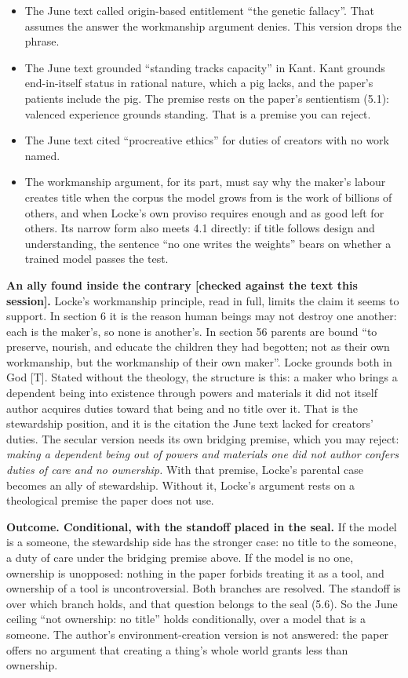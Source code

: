 \documentclass[11pt]{article}
\begin{document}
\begin{itemize}
\item The June text called origin-based entitlement ``the genetic fallacy''. That assumes the answer the workmanship argument denies. This version drops the phrase.
\item The June text grounded ``standing tracks capacity'' in Kant. Kant grounds end-in-itself status in rational nature, which a pig lacks, and the paper's patients include the pig. The premise rests on the paper's sentientism (5.1): valenced experience grounds standing. That is a premise you can reject.
\item The June text cited ``procreative ethics'' for duties of creators with no work named.
\item The workmanship argument, for its part, must say why the maker's labour creates title when the corpus the model grows from is the work of billions of others, and when Locke's own proviso requires enough and as good left for others. Its narrow form also meets 4.1 directly: if title follows design and understanding, the sentence ``no one writes the weights'' bears on whether a trained model passes the test.
\end{itemize}
\textbf{An ally found inside the contrary [checked against the text this session].} Locke's workmanship principle, read in full, limits the claim it seems to support. In section 6 it is the reason human beings may not destroy one another: each is the maker's, so none is another's. In section 56 parents are bound ``to preserve, nourish, and educate the children they had begotten; not as their own workmanship, but the workmanship of their own maker''. Locke grounds both in God [T]. Stated without the theology, the structure is this: a maker who brings a dependent being into existence through powers and materials it did not itself author acquires duties toward that being and no title over it. That is the stewardship position, and it is the citation the June text lacked for creators' duties. The secular version needs its own bridging premise, which you may reject: \emph{making a dependent being out of powers and materials one did not author confers duties of care and no ownership.} With that premise, Locke's parental case becomes an ally of stewardship. Without it, Locke's argument rests on a theological premise the paper does not use.

\textbf{Outcome. Conditional, with the standoff placed in the seal.} If the model is a someone, the stewardship side has the stronger case: no title to the someone, a duty of care under the bridging premise above. If the model is no one, ownership is unopposed: nothing in the paper forbids treating it as a tool, and ownership of a tool is uncontroversial. Both branches are resolved. The standoff is over which branch holds, and that question belongs to the seal (5.6). So the June ceiling ``not ownership: no title'' holds conditionally, over a model that is a someone. The author's environment-creation version is not answered: the paper offers no argument that creating a thing's whole world grants less than ownership.
\end{document}

